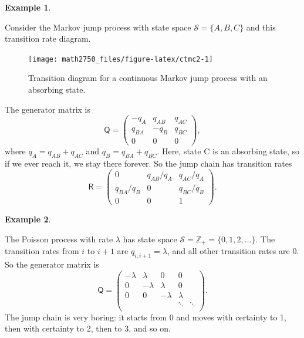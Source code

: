 \documentclass[
  a4paper,
]{article}
\theoremstyle{definition}
\theoremstyle{definition}
\newtheorem{example}{Example}[section]
\theoremstyle{definition}
\theoremstyle{remark}
\begin{document}
\begin{example}
\protect\hypertarget{exm:ABC}{}\label{exm:ABC}

Consider the Markov jump process with state space \(\mathcal S = \{A,B,C\}\) and this transition rate diagram.

\begin{figure}

{\centering \texttt{[image: math2750\_files/figure-latex/ctmc2-1]} 

}

\caption{Transition diagram for a continuous Markov jump process with an absorbing state.}\label{fig:ctmc2}
\end{figure}

The generator matrix is
\[ \mathsf Q = \begin{pmatrix} -q_A & q_{AB} & q_{AC} \\
 q_{BA} & -q_B & q_{BC} \\
 0 & 0 & 0\end{pmatrix} , \]
where \(q_A = q_{AB} + q_{AC}\) and \(q_B = q_{BA} + q_{BC}\).
Here, state C is an absorbing state, so if we ever reach it, we stay there forever. So the jump chain has transition rates
\[ \mathsf R = \begin{pmatrix} 0 & q_{AB}/q_A & q_{AC}/q_A \\
 q_{BA}/q_B & 0 & q_{BC}/q_B \\
 0 & 0 & 1 \end{pmatrix} . \]

\end{example}

\begin{example}
\protect\hypertarget{exm:PP-CTMC}{}\label{exm:PP-CTMC}

The Poisson process with rate \(\lambda\) has state space \(\mathcal S = \mathbb Z_+ = \{0,1,2,\dots\}\). The transition rates from \(i\) to \(i+1\) are
\(q_{i,i+1} = \lambda\), and all other transition rates are 0. So the generator matrix is
\[ \mathsf Q = \begin{pmatrix} -\lambda & \lambda & 0 & 0 &  \\
 0 & -\lambda & \lambda & 0 &   \\
0 & 0 & -\lambda & \lambda &   \\ 
 & & & \ddots & \ddots \\ 
 \end{pmatrix}.
\]
The jump chain is very boring: it starts from 0 and moves with certainty to 1, then with certainty to 2, then to 3, and so on.

\end{example}
\end{document}
